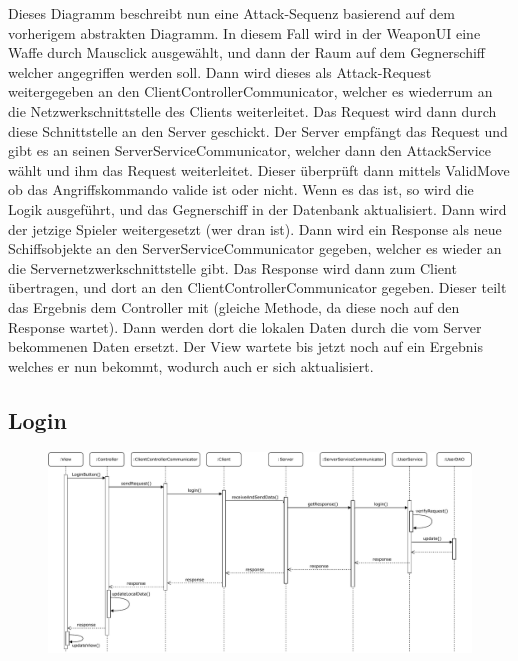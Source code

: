 \documentclass[fontsize=12pt,paper=a4,twoside]{scrartcl}
\begin{document}
Dieses Diagramm beschreibt nun eine Attack-Sequenz basierend auf dem vorherigem abstrakten Diagramm. In diesem Fall wird in der WeaponUI eine Waffe durch Mausclick ausgewählt, und dann der Raum auf dem Gegnerschiff welcher angegriffen werden soll. Dann wird dieses als Attack-Request weitergegeben an den ClientControllerCommunicator, welcher es wiederrum an die Netzwerkschnittstelle des Clients weiterleitet. Das Request wird dann durch diese Schnittstelle an den Server geschickt. Der Server empfängt das Request und gibt es an seinen ServerServiceCommunicator, welcher dann den AttackService wählt und ihm das Request weiterleitet. Dieser überprüft dann mittels ValidMove ob das Angriffskommando valide ist oder nicht. Wenn es das ist, so wird die Logik ausgeführt, und das Gegnerschiff in der Datenbank aktualisiert. Dann wird der jetzige Spieler weitergesetzt (wer dran ist). Dann wird ein Response als neue Schiffsobjekte an den ServerServiceCommunicator gegeben, welcher es wieder an die Servernetzwerkschnittstelle gibt. Das Response wird dann zum Client übertragen, und dort an den ClientControllerCommunicator gegeben. Dieser teilt das Ergebnis dem Controller mit (gleiche Methode, da diese noch auf den Response wartet). Dann werden dort die lokalen Daten durch die vom Server bekommenen Daten ersetzt. Der View wartete bis jetzt noch auf ein Ergebnis welches er nun bekommt, wodurch auch er sich aktualisiert.


\subsection{Login}

\begin{figure}[H]
\begin{center}
  \includegraphics[width=\linewidth]{UML/Sequenz-Client-login.pdf}
\end{center}
\end{figure}
\end{document}
